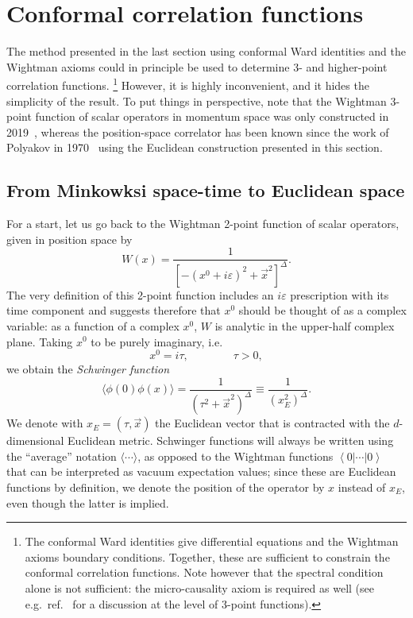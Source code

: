 \documentclass[a4paper,12pt]{article}
\newcommand{\ket}[1]{\left| #1 \right\rangle}
\newcommand{\bra}[1]{\left\langle #1 \right|}
\numberwithin{equation}{section}
\begin{document}

\section{Conformal correlation functions}
\label{sec:correlators}

The method presented in the last section using conformal Ward identities and the Wightman axioms could in principle be used to determine 3- and higher-point correlation functions.%
%
\footnote{The conformal Ward identities give differential equations and the Wightman axioms boundary conditions. Together, these are sufficient to constrain the conformal correlation functions. Note however that the spectral condition alone is not sufficient: the micro-causality axiom is required as well (see e.g.~ref.~\cite{Gillioz:2021sce} for a discussion at the level of 3-point functions).}
%
However, it is highly inconvenient, and it hides the simplicity of the result. To put things in perspective, note that the Wightman 3-point function of scalar operators in momentum space was only constructed in 2019~\cite{Gillioz:2019lgs}, whereas the position-space correlator has been known since the work of Polyakov in 1970~\cite{Polyakov:1970xd} using the Euclidean construction presented in this section.


\subsection{From Minkowksi space-time to Euclidean space}

For a start, let us go back to the Wightman 2-point function of scalar operators, given in position space by
\begin{equation}
	W(x) = \frac{1}{\left[ -(x^0 + i \varepsilon)^2
	+ \vec{x}^2 \right]^\Delta}.
\end{equation}
The very definition of this 2-point function includes an $i \varepsilon$ prescription with its time component and suggests therefore that $x^0$ should be thought of as a complex variable: as a function of a complex $x^0$, $W$ is analytic in the upper-half complex plane. Taking $x^0$ to be purely imaginary, i.e.
\begin{equation}
	x^0 = i \tau,
	\qquad\qquad
	\tau > 0,
\end{equation}
we obtain the \emph{Schwinger function}
\begin{equation}
	\langle \phi(0) \phi(x) \rangle
	= \frac{1}{( \tau^2 + \vec{x}^2 )^\Delta}
	\equiv \frac{1}{(x_E^2)^\Delta}.
	\label{eq:2pt:Schwinger}
\end{equation}
We denote with $x_E = (\tau, \vec{x})$ the Euclidean vector that is contracted with the $d$-dimensional Euclidean metric. Schwinger functions will always be written using the ``average'' notation $\langle \cdots \rangle$, as opposed to the Wightman functions $\bra{0} \cdots \ket{0}$ that can be interpreted as vacuum expectation values; since these are Euclidean functions by definition, we denote the position of the operator by $x$ instead of $x_E$, even though the latter is implied.
\end{document}
